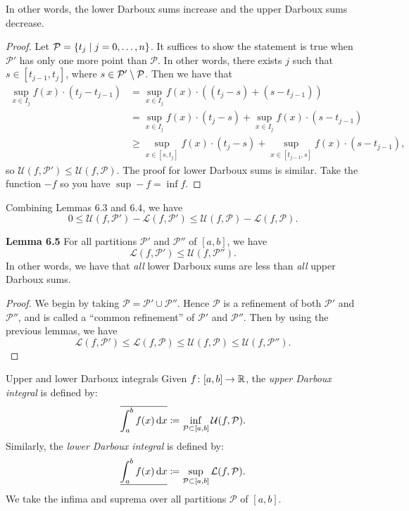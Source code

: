 \documentclass[class=article, crop=false]{standalone}
\begin{document}
  In other words, the lower Darboux sums increase and the upper Darboux sums decrease.
  \begin{proof}
    Let $\mathcal{P} = \left\{t_j\mid j = 0,\dotsc,n\right\}$. It suffices to show the statement is true when $\mathcal{P}'$ has only one more point than $\mathcal{P}$. In other words, there exists $j$ such that $s\in [t_{j - 1}, t_j]$, where $s\in \mathcal{P}'\setminus \mathcal{P}$. Then we have that
    \begin{align*}
      \sup_{x\in I_j} f(x)\cdot (t_j - t_{j - 1}) &= \sup_{x\in I_j} f(x)\cdot ((t_j - s) + (s - t_{j - 1})) \\
                                                  &= \sup_{x\in I_j} f(x)\cdot (t_j - s) + \sup_{x\in I_j} f(x)\cdot (s - t_{j - 1}) \\
                                                  &\geq \sup_{x\in [s, t_j]} f(x)\cdot (t_j - s) + \sup_{x\in [t_{j - 1}, s]} f(x)\cdot (s - t_{j - 1}),
    \end{align*}
    so $\mathcal{U}(f, \mathcal{P}')\leq \mathcal{U}(f, \mathcal{P})$. The proof for lower Darboux sums is similar. Take the function $-f$ so you have $\sup -f = \inf f$.
  \end{proof}
  \begin{note}{}
    Combining Lemmas $6.3$ and $6.4$, we have
    \[
      0\leq \mathcal{U}(f, \mathcal{P}') - \mathcal{L}(f, \mathcal{P}') \leq \mathcal{U}(f, \mathcal{P}) - \mathcal{L}(f, \mathcal{P}).
    \]
  \end{note}
  \textbf{Lemma 6.5} For all partitions $\mathcal{P}'$ and $\mathcal{P}''$ of $[a, b]$, we have
  \[
    \mathcal{L}(f, \mathcal{P}')\leq \mathcal{U}(f, \mathcal{P}'').
  \]
  In other words, we have that \emph{all} lower Darboux sums are less than \emph{all} upper Darboux sums.
  \begin{proof}
    We begin by taking $\mathcal{P} = \mathcal{P}'\cup \mathcal{P}''$. Hence $\mathcal{P}$ is a refinement of both $\mathcal{P}'$ and $\mathcal{P}''$, and is called a ``common refinement'' of $\mathcal{P}'$ and $\mathcal{P}''$. Then by using the previous lemmas, we have
    \[
      \mathcal{L}(f, \mathcal{P}')\leq \mathcal{L}(f, \mathcal{P})\leq \mathcal{U}(f, \mathcal{P})\leq \mathcal{U}(f, \mathcal{P}'').
    \]
  \end{proof}
  \begin{definition}{Upper and lower Darboux integrals}
    Given $f\colon [a, b]\to \mathbb{R}$, the \emph{upper Darboux integral} is defined by:
    \[
      \overline{\int_{a}^{b}f(x) \,\mathrm dx}\coloneqq \inf_{\mathcal{P}\subset [a, b]}\mathcal{U}(f, \mathcal{P}).
    \]
    Similarly, the \emph{lower Darboux integral} is defined by:
    \[
      \underline{\int_{a}^{b}f(x) \,\mathrm dx}\coloneqq \sup_{\mathcal{P}\subset [a, b]}\mathcal{L}(f, \mathcal{P}).
    \]
    We take the infima and suprema over all partitions $\mathcal{P}$ of $[a, b]$.
  \end{definition}
\end{document}
